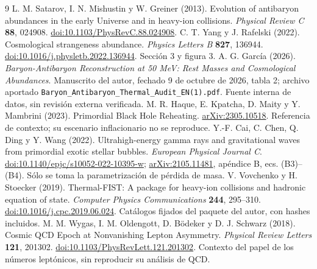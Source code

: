 \documentclass[10pt,twocolumn,a4paper]{article}
\begin{document}
\begin{thebibliography}{9}\small
{} L. M. Satarov, I. N. Mishustin y W. Greiner (2013). Evolution of antibaryon abundances in the early Universe and in heavy-ion collisions. \textit{Physical Review C} \textbf{88}, 024908. \href{https://doi.org/10.1103/PhysRevC.88.024908}{doi:10.1103/PhysRevC.88.024908}.
 C. T. Yang y J. Rafelski (2022). Cosmological strangeness abundance. \textit{Physics Letters B} \textbf{827}, 136944. \href{https://doi.org/10.1016/j.physletb.2022.136944}{doi:10.1016/j.physletb.2022.136944}. Sección 3 y figura 3.
 A. G. García (2026). \textit{Baryon-Antibaryon Reconstruction at 50 MeV: Rest Masses and Cosmological Abundances}. Manuscrito del autor, fechado 9 de octubre de 2026, tabla 2; archivo aportado \texttt{Baryon\_Antibaryon\_Thermal\_Audit\_EN(1).pdf}. Fuente interna de datos, sin revisión externa verificada.
 M. R. Haque, E. Kpatcha, D. Maity y Y. Mambrini (2023). Primordial Black Hole Reheating. \href{https://arxiv.org/abs/2305.10518}{arXiv:2305.10518}. Referencia de contexto; su escenario inflacionario no se reproduce.
 Y.-F. Cai, C. Chen, Q. Ding y Y. Wang (2022). Ultrahigh-energy gamma rays and gravitational waves from primordial exotic stellar bubbles. \textit{European Physical Journal C}. \href{https://doi.org/10.1140/epjc/s10052-022-10395-w}{doi:10.1140/epjc/s10052-022-10395-w}; \href{https://arxiv.org/abs/2105.11481}{arXiv:2105.11481}, apéndice B, ecs. (B3)--(B4). Sólo se toma la parametrización de pérdida de masa.
 V. Vovchenko y H. Stoecker (2019). Thermal-FIST: A package for heavy-ion collisions and hadronic equation of state. \textit{Computer Physics Communications} \textbf{244}, 295--310. \href{https://doi.org/10.1016/j.cpc.2019.06.024}{doi:10.1016/j.cpc.2019.06.024}. Catálogos fijados del paquete del autor, con hashes incluidos.
 M. M. Wygas, I. M. Oldengott, D. B\"odeker y D. J. Schwarz (2018). Cosmic QCD Epoch at Nonvanishing Lepton Asymmetry. \textit{Physical Review Letters} \textbf{121}, 201302. \href{https://doi.org/10.1103/PhysRevLett.121.201302}{doi:10.1103/PhysRevLett.121.201302}. Contexto del papel de los números leptónicos, sin reproducir su análisis de QCD.
\end{thebibliography}
\end{document}
